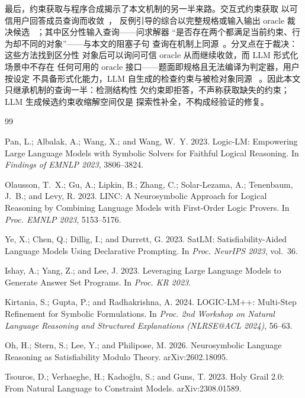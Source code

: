 \documentclass[letterpaper]{article}
\begin{document}
最后，约束获取与程序合成揭示了本文机制的另一半来路。交互式约束获取
以可信用户回答成员查询而收敛~\cite{bessiere2013,tsouros2024}，
反例引导的综合以完整规格或输入输出 oracle 裁决候选
~\cite{solar2006,jha2010,jha2017}；其中区分性输入查询——问求解器
``是否存在两个都满足当前约束、行为却不同的对象''——与本文的阻塞子句
查询在机制上同源~\cite{jha2010}。分叉点在于裁决：这些方法找到区分性
对象后可以询问可信 oracle 从而继续收敛，而 LLM 形式化场景中不存在
任何可用的 oracle 接口——题面即规格且无法编译为判定器，用户按设定
不具备形式化能力，LLM 自生成的检查约束与被检对象同源
~\cite{chen2023codet}。因此本文只继承机制的查询一半：检测结构性
欠约束即拒答，不声称获取缺失的约束；LLM 生成候选约束收缩解空间仅是
探索性补全，不构成经验证的修复。

\begin{thebibliography}{99}

Pan, L.; Albalak, A.; Wang, X.; and Wang, W.~Y. 2023.
Logic-LM: Empowering Large Language Models with Symbolic Solvers for Faithful Logical Reasoning.
In \textit{Findings of EMNLP 2023}, 3806--3824.

Olausson, T.~X.; Gu, A.; Lipkin, B.; Zhang, C.; Solar-Lezama, A.; Tenenbaum, J.~B.; and Levy, R. 2023.
LINC: A Neurosymbolic Approach for Logical Reasoning by Combining Language Models with First-Order Logic Provers.
In \textit{Proc. EMNLP 2023}, 5153--5176.

Ye, X.; Chen, Q.; Dillig, I.; and Durrett, G. 2023.
SatLM: Satisfiability-Aided Language Models Using Declarative Prompting.
In \textit{Proc. NeurIPS 2023}, vol.~36.

Ishay, A.; Yang, Z.; and Lee, J. 2023.
Leveraging Large Language Models to Generate Answer Set Programs.
In \textit{Proc. KR 2023}.

Kirtania, S.; Gupta, P.; and Radhakrishna, A. 2024.
LOGIC-LM++: Multi-Step Refinement for Symbolic Formulations.
In \textit{Proc. 2nd Workshop on Natural Language Reasoning and Structured
Explanations (NLRSE@ACL 2024)}, 56--63.

Oh, H.; Stern, S.; Lee, Y.; and Philipose, M. 2026.
Neurosymbolic Language Reasoning as Satisfiability Modulo Theory.
arXiv:2602.18095.

Tsouros, D.; Verhaeghe, H.; Kad{\i}o\u{g}lu, S.; and Guns, T. 2023.
Holy Grail 2.0: From Natural Language to Constraint Models.
arXiv:2308.01589.


\end{thebibliography}
\end{document}

